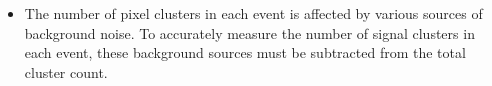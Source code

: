 \begin{itemize}
\item The number of pixel clusters in each event is affected by various sources of background noise. %
  To accurately measure the number of signal clusters in each event, these background sources must be subtracted from the total cluster count.



\end{itemize}
